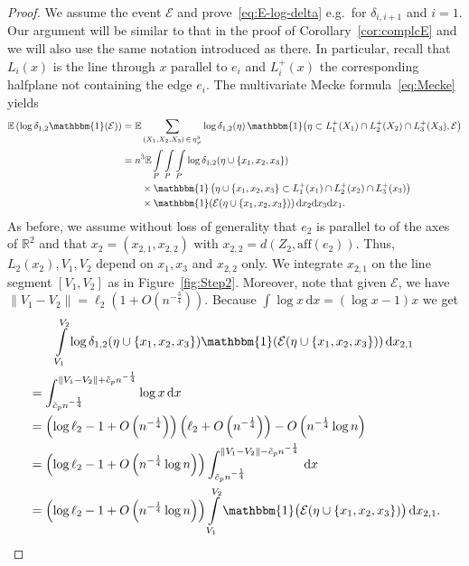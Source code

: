 \documentclass[10pt]{amsart}
\theoremstyle{definition}\newtheorem{defi}[theo]{Definition}\newtheorem{rema}[theo]{Remark}\newtheorem{exam}[theo]{Example}\newtheorem{exem}[theo]{Example}\newtheorem{nota}[theo]{Notation}
\newcommand{\ind}{\mathbbm{1}}
\newcommand{\bbR}{\mathbb{R}}
\newcommand{\bbE}{\mathbb{E}}
\newcommand{\clE}{\mathcal{E}}
\newcommand{\aff}{\mathrm{aff}}
\let\oldtilde\tilde
\renewcommand*{\tilde}[1]{\mathchoice{\widetilde{#1}}{\widetilde{#1}}{\oldtilde{#1}}{\oldtilde{#1}}}
\begin{document}
\begin{proof}
We assume the event $\clE$ and prove~\eqref{eq:E-log-delta} e.g.\ for $\delta_{i,i+1}$ and $i=1$. Our argument will be similar to that in the proof of Corollary~\ref{cor:complcE} and we will also use the same notation introduced as there. In particular, recall that $L_i(x)$ is the line through $x$ parallel to $e_i$ and $L_i^+(x)$ the corresponding halfplane not containing the edge $e_i$. The multivariate Mecke formula~\eqref{eq:Mecke} yields
\begin{align*}
\bbE \left(\log \delta_{1,2} \ind(\clE)\right) & =
\bbE \sum_{(X_1, X_2, X_3)\,\in\,\eta_{\neq}^3} \log \delta_{1,2}(\eta)\, \ind\big(\eta \subset L_1^+(X_1) \cap L_2^+ (X_2) \cap L_3^+ (X_3), \clE\big)
\\ &= n^3 \bbE \int\limits_{P}\int\limits_{P}\int\limits_{P} \log \delta_{1,2}(\eta\cup\{x_1,x_2,x_3\})
\\ &\qquad \times
\ind\left(\eta\cup\{x_1,x_2,x_3\}\subset L_1^+(x_1) \cap L_2^+ (x_2) \cap L_3^+ (x_3)\right)
\\ &\qquad \times
\ind(\clE(\eta\cup\{x_1,x_2,x_3\}))\, \mathrm{d} x_2 \mathrm{d} x_3 \mathrm{d} x_1.
\end{align*}
As before, we assume without loss of generality that $e_2$ is parallel to of the axes of $\bbR^2$ and that $x_2=(x_{2,1},x_{2,2})$ with $x_{2,2}=d(Z_2,\aff(e_2))$. Thus, $L_2 (x_2), V_1,V_2$ depend on $x_1,x_3$ and $x_{2,2}$ only. We integrate $x_{2,1}$ on the line segment $[V_1,V_2]$ as in Figure~\ref{fig:Step2}. Moreover, note that given $\clE$, we have $\| V_1-V_2 \| = \ell_2(1+O(n^{- \frac 34}))$. Because $ \int \log x\, \mathrm{d} x = (\log x - 1) x $ we get
\begin{multline*}
\int\limits_{V_1}^{V_2} \log \delta_{1,2}(\eta\cup\{x_1,x_2,x_3\}) \ind(\clE(\eta\cup\{x_1,x_2,x_3\})) \, \mathrm{d} x_{2,1}\\
\begin{aligned}
&=\int_{\tilde c_p n^{- \frac 14}}^{\|V_1-V_2\|+ \tilde c_p n^{- \frac 14}} \log x \, \mathrm{d} x \\
&= \left(\log \ell_2 - 1 +O\left(n^{- \frac 14}\right)\right) \left(\ell_2 + O\left(n^{- \frac 14}\right)\right) - O\left(n^{- \frac 14} \log n\right)
\\ &=
\left(\log \ell_2 - 1 +O\left(n^{- \frac 14} \log n\right)\right) \int_{\tilde c_p n^{- \frac 14}}^{\|V_1-V_2\|- \tilde c_p n^{- \frac 14}} \, \mathrm{d} x
\\ &=
\left(\log \ell_2 - 1 +O\left(n^{- \frac 14} \log n\right)\right) \int\limits_{V_1}^{V_2} \ind\big(\clE(\eta\cup\{x_1,x_2,x_3\})\big) \, \mathrm{d} x_{2,1}.

\end{aligned}
\end{multline*}
\end{proof}
\end{document}
